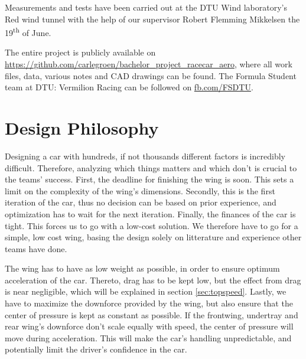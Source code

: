   Measurements and tests have been carried out at the DTU Wind laboratory's Red wind tunnel with the help of our supervisor Robert Flemming Mikkelsen the 19\textsuperscript{th} of June.

  The entire project is publicly available on \url{https://github.com/carlegroen/bachelor_project_racecar_aero}, where all work files, data, various notes and CAD drawings can be found. The Formula Student team at DTU: Vermilion Racing can be followed on \url{fb.com/FSDTU}.

\section{Design Philosophy}
  Designing a car with hundreds, if not thousands different factors is incredibly difficult. Therefore, analyzing which things matters and which don't is crucial to the teams' success. First, the deadline for finishing the wing is soon. This sets a limit on the complexity of the wing's dimensions. Secondly, this is the first iteration of the car, thus no decision can be based on prior experience, and optimization has to wait for the next iteration. Finally, the finances of the car is tight. This forces us to go with a low-cost solution. We therefore have to go for a simple, low cost wing, basing the design solely on litterature and experience other teams have done.

  The wing has to have as low weight as possible, in order to ensure optimum acceleration of the car. Thereto, drag has to be kept low, but the effect from drag is near negligible, which will be explained in section \ref{sec:topspeed}. Lastly, we have to maximize the downforce provided by the wing, but also ensure that the center of pressure is kept as constant as possible. If the frontwing, undertray and rear wing's downforce don't scale equally with speed, the center of pressure will move during acceleration. This will make the car's handling unpredictable, and potentially limit the driver's confidence in the car.

